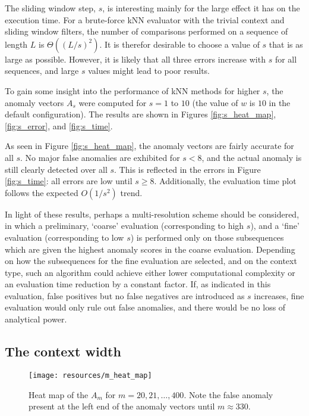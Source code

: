 The sliding window step, $s$, is interesting mainly for the large effect it has on the execution time. For a brute-force kNN evaluator with the trivial context and sliding window filters, the number of comparisons performed on a sequence of length $L$ is $\Theta((L/s)^2)$. It is therefor desirable to choose a value of $s$ that is as large as possible. However, it is likely that all three errors increase with $s$ for all sequences, and large $s$ values might lead to poor results.

To gain some insight into the performance of kNN methods for higher $s$, the anomaly vectors $A_s$ were computed for $s = 1$ to $10$ (the value of $w$ is $10$ in the default configuration). The results are shown in Figures \ref{fig:s_heat_map}, \ref{fig:s_error}, and \ref{fig:s_time}.

As seen in Figure \ref{fig:s_heat_map}, the anomaly vectors are fairly accurate for all $s$. No major false anomalies are exhibited for $s < 8$, and the actual anomaly is still clearly detected over all $s$. This is reflected in the errors in Figure \ref{fig:s_time}: all errors are low until $s \geq 8$. Additionally, the evaluation time plot follows the expected $O(1/s^2)$ trend.

In light of these results, perhaps a multi-resolution scheme should be considered, in which a preliminary, `coarse' evaluation (corresponding to high $s$), and a `fine' evaluation (corresponding to low $s$) is performed only on those subsequences which are given the highest anomaly scores in the coarse evaluation. Depending on how the subsequences for the fine evaluation are selected, and on the context type, such an algorithm could achieve either lower computational complexity or an evaluation time reduction by a constant factor. If, as indicated in this evaluation, false positives but no false negatives are introduced as $s$ increases, fine evaluation would only rule out false anomalies, and there would be no loss of analytical power. 

\subsection{The context width}
\FloatBarrier
\label{sect:m}

\begin{figure}[H]
    \vspace{-15pt}
    \begin{center}
        \texttt{[image: resources/m\_heat\_map]}
    \end{center}
    \vspace{-20pt}
    \caption{\small{Heat map of the $A_m$ for $m = 20, 21, \dots, 400$. Note the false anomaly present at the left end of the anomaly vectors until $m \approx 330$.}}
    \vspace{-10pt}
    \label{fig:m_heat_map}
\end{figure}

